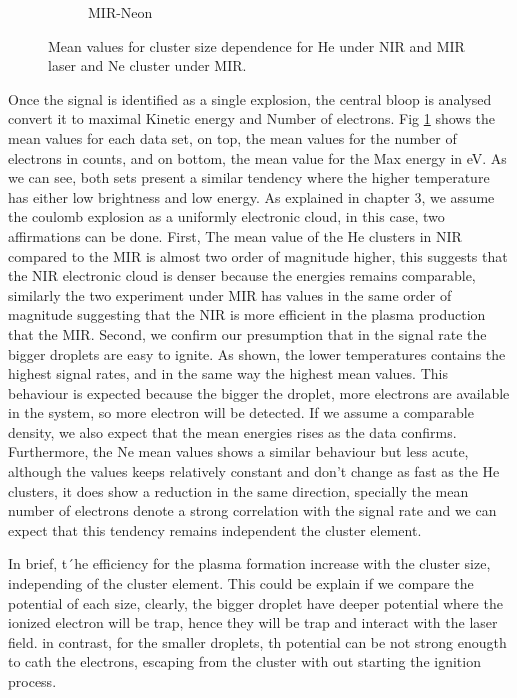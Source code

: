 \begin{figure}[h!]
\begin{subfigure}[l]{0.32\textwidth}
\caption{MIR-Neon  }\end{subfigure}
\caption[Cluster size- Mean values]{Mean values for cluster size dependence for He  under NIR and MIR laser and Ne cluster under MIR.}
\label{fig:ClusterSizemean}
\end{figure}

Once the signal is identified as a single explosion, the central bloop is analysed convert it to maximal Kinetic energy and Number of electrons. Fig \ref{fig:ClusterSizemean} shows the mean values for each data set, on top, the mean values for the number of electrons in counts, and on bottom, the mean value for the Max energy in eV. As we can see, both sets present a similar tendency where the higher temperature has either low brightness and low energy. As explained in chapter 3, we assume the coulomb explosion as a uniformly electronic cloud, in this case, two affirmations can be done. First, The mean value of the He clusters in NIR compared to the MIR is almost two order of magnitude higher, this suggests that the NIR electronic cloud is denser because the energies remains comparable, similarly  the two experiment under MIR has values in the same order of magnitude suggesting that the NIR is more efficient in the plasma production that the MIR. Second, we confirm our presumption that in the signal rate the bigger droplets are easy to ignite. As shown, the lower temperatures contains the highest signal rates, and in the same way the highest mean values. This behaviour is expected because the bigger the droplet, more electrons are available in the system, so more electron will be detected. If we assume a comparable density, we also expect that the mean energies rises as the data confirms. Furthermore, the Ne mean values shows a similar behaviour but less acute, although the values keeps relatively constant and don't change as fast as the He clusters, it does show a reduction in the same direction, specially the mean number of electrons denote a strong correlation with the signal rate and we can expect that  this tendency remains independent the cluster element.

In brief, t´he efficiency for the plasma  formation increase with the cluster size, independing of the cluster element. This could be explain if we compare the potential of each size, clearly, the bigger droplet have deeper potential where the ionized electron will be trap, hence they will be trap and interact with the laser field. in contrast, for the smaller droplets, th potential can be not strong enougth to cath the electrons, escaping from the cluster with out starting the ignition process. 


